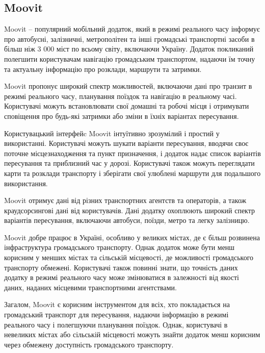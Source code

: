 \subsection{Moovit}
\label{subsec:moovit-subsection}

Moovit -- популярний мобільний додаток, який в режимі реального часу інформує про автобусні, залізничні, метрополітен та інші громадські транспортні засоби в більш ніж 3 000 міст по всьому світу, включаючи Україну. Додаток покликаний полегшити користувачам навігацію громадським транспортом, надаючи їм точну та актуальну інформацію про розклади, маршрути та затримки.

Moovit пропонує широкий спектр можливостей, включаючи дані про транзит в режимі реального часу, планування поїздок та навігацію в реальному часі. Користувачі можуть встановлювати свої домашні та робочі місця і отримувати сповіщення про будь-які затримки або зміни в їхніх варіантах пересування.

Користувацький інтерфейc Moovit інтуїтивно зрозумілий і простий у використанні. Користувачі можуть шукати варіанти пересування, вводячи своє поточне місцезнаходження та пункт призначення, і додаток надає список варіантів пересування та приблизний час у дорозі. Користувачі також можуть переглядати карти та розклади транспорту і зберігати свої улюблені маршрути для подальшого використання.

Moovit отримує дані від різних транспортних агентств та операторів, а також краудсорсингові дані від користувачів. Дані додатку охоплюють широкий спектр варіантів пересування, включаючи автобуси, поїзди, метро та легку залізницю.

Moovit добре працює в Україні, особливо у великих містах, де є більш розвинена інфраструктура громадського транспорту. Однак додаток може бути менш корисним у менших містах та сільській місцевості, де можливості громадського транспорту обмежені. Користувачі також повинні знати, що точність даних додатку в режимі реального часу може змінюватися в залежності від якості даних, наданих місцевими транспортними агентствами.

Загалом, Moovit є корисним інструментом для всіх, хто покладається на громадський транспорт для пересування, надаючи інформацію в режимі реального часу і полегшуючи планування поїздок. Однак, користувачі в невеликих містах або сільській місцевості можуть знайти додаток менш корисним через обмежену доступність громадського транспорту.
